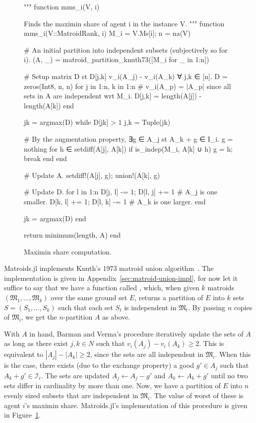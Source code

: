 \begin{figure}
  \begin{jllisting}
"""
  function mms_i(V, i)

Finds the maximin share of agent i in the instance V.
"""
function mms_i(V::MatroidRank, i)
  M_i = V.Ms[i]; n = na(V)

  # An initial partition into independent subsets (subjectively so for i).
  (A, _) = matroid_partition_knuth73([M_i for _ in 1:n])

  # Setup matrix D st D[j,k] v_i(A_j) - v_i(A_k) ∀ j,k ∈ [n].
  D = zeros(Int8, n, n)
  for j in 1:n, k in 1:n
      # v_i(A_p) = |A_p| since all sets in A are independent wrt M_i.
      D[j,k] = length(A[j]) - length(A[k])
  end

  jk = argmax(D)
  while D[jk] > 1
      j,k = Tuple(jk)

      # By the augmentation property, ∃g ∈ A_j st A_k + g ∈ I_i.
      g = nothing
      for h ∈ setdiff(A[j], A[k]) 
          if is_indep(M_i, A[k] ∪ h)
              g = h; break
          end 
      end

      # Update A.
      setdiff!(A[j], g); union!(A[k], g)

      # Update D.
      for l in 1:n
          D[j, l] -= 1; D[l, j] += 1 # A_j is one smaller.
          D[k, l] += 1; D[l, k] -= 1 # A_k is one larger.
      end

      jk = argmax(D)
  end
  
  return minimum(length, A)
end
  \end{jllisting}
  \caption{Maximin share computation.}
  \label{code:mms_i}
\end{figure}

Matroids.jl implements Knuth's 1973 matroid union algorithm~\cite{knuth1973matroidpartitioning}. The implementation is given in Appendix~\ref{sec:matroid-union-impl}, for now let it suffice to say that we have a function called , which, when given $k$ matroids $(\mathfrak{M}_1,\dots,\mathfrak{M}_k)$ over the same ground set $E$, returns a partition of $E$ into $k$ sets $S = (S_1, \dots, S_k)$ such that each set $S_t$ is independent in $\mathfrak{M}_t$. By passing $n$ copies of $\mathfrak{M}_i$, we get the $n$-partition $A$ as above.

With $A$ in hand, Barman and Verma's procedure iteratively update the sets of $A$ as long as there exist $j, k \in N$ such that $v_i(A_j) - v_i(A_k) \geq 2$. This is equivalent to $|A_j| - |A_k| \geq 2$, since the sets are all independent in $\mathfrak{M}_i$. When this is the case, there exists (due to the exchange property) a good $g'\in A_j$ such that $A_k + g' \in \mathcal{I}_i$. The sets are updated $A_j \leftarrow A_j - g'$ and $A_k \leftarrow A_k + g'$ until no two sets differ in cardinality by more than one. Now, we have a partition of $E$ into $n$ evenly sized subsets that are independent in $\mathfrak{M}_i$. The value of worst of these is agent $i$'s maximin share. Matroids.jl's implementation of this procedure is given in Figure~\ref{code:mms_i}.




